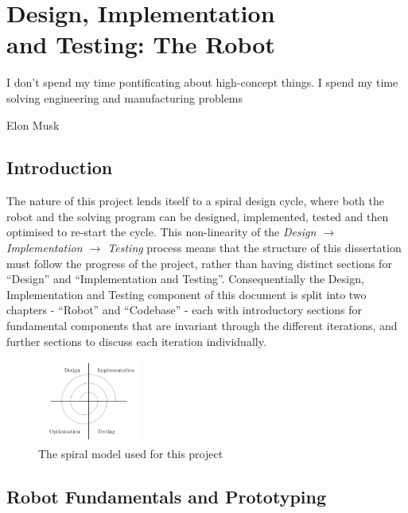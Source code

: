 \documentclass{report}
\newcommand{\tit}[1]{\textit{#1}}
\begin{document}
    \newpage
    
    \chapter[Design, Implementation and Testing: The Robot]{Design, Implementation \\ and Testing: The Robot} \label{chp:designRobot}
    \epigraph{I don’t spend my time pontificating about high-concept things. I spend my time solving engineering and manufacturing problems}{Elon Musk\cite{Ohnsman2013}}
    
	\section{Introduction}
	
	The nature of this project lends itself to a spiral design cycle, where both the robot and the solving program can be designed, implemented, tested and then optimised to re-start the cycle. This non-linearity of the \tit{Design $\rightarrow$ Implementation $\rightarrow$ Testing} process means that the structure of this dissertation must follow the progress of the project, rather than having distinct sections for \enquote{Design} and \enquote{Implementation and Testing}. Consequentially the Design, Implementation and Testing component of this document is split into two chapters - \enquote{Robot} and \enquote{Codebase} - each with introductory sections for fundamental components that are invariant through the different iterations, and further sections to discuss each iteration individually.

	\begin{figure}[H]
		\begin{center}
			\includegraphics[width=0.3\textwidth]{Resources/Images/diagSpiralModel.png}
			\caption{The spiral model used for this project}
			\label{fig:diagSpiralModel}
		\end{center}
	\end{figure}

    \section{Robot Fundamentals and Prototyping}
    
\end{document}
